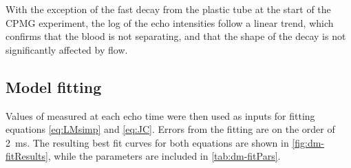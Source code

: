 With the exception of the fast decay from the plastic tube at the start of the CPMG experiment, the log of the echo intensities follow a linear trend, which confirms that the blood is not separating, and that the shape of the decay is not significantly affected by flow.

\subsection{Model fitting}

Values of \Ttwo measured at each echo time were then used as inputs for fitting equations \ref{eq:LMsimp} and \ref{eq:JC}.
Errors from the \Ttwo fitting are on the order of \SI{2}{ms}.
The resulting best fit curves for both equations are shown in \autoref{fig:dm-fitResults}, while the parameters are included in \autoref{tab:dm-fitPars}.

